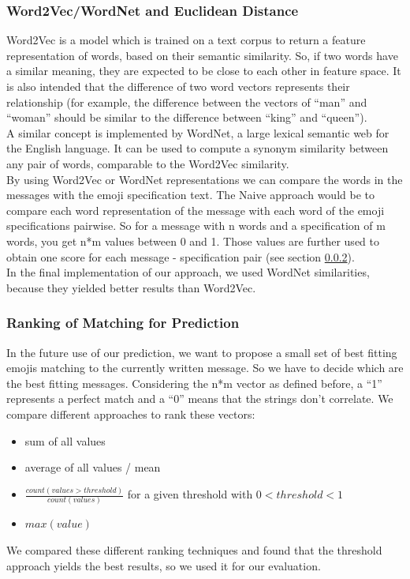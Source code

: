 \documentclass{article}
\begin{document}
\subsubsection{Word2Vec/WordNet and Euclidean Distance}
\label{word2vec}
Word2Vec is a model which is trained on a text corpus to return a feature representation of words, based on their semantic similarity. So, if two words have a similar meaning, they are expected to be close to each other in feature space. It is also intended that the difference of two word vectors represents their relationship (for example, the difference between the vectors of “man” and “woman” should be similar to the difference between “king” and “queen”).\\
A similar concept is implemented by WordNet, a large lexical semantic web for the English language. It can be used to compute a synonym similarity between any pair of words, comparable to the Word2Vec similarity.\\
By using Word2Vec or WordNet representations we can compare the words in the messages with the emoji specification text. The Naive approach would be to compare each word representation of the message with each word of the emoji specifications pairwise. So for a message with n words and a specification of m words, you get n*m values between 0 and 1. Those values are further used to obtain one score for each message - specification pair (see section \ref{ranking}). \\
In the final implementation of our approach, we used WordNet similarities, because they yielded better results than Word2Vec.

\subsubsection{Ranking of Matching for Prediction}
\label{ranking}
In the future use of our prediction, we want to propose a small set of best fitting emojis matching to the currently written message. So we have to decide which are the best fitting messages. Considering the n*m vector as defined before, a “1” represents a perfect match and a “0” means that the strings don’t correlate.  We compare different approaches to rank these vectors:
\begin{itemize}
    \item sum of all values
    \item average of all values / mean
    \item $\frac{count(values>threshold)}{count(values)}$ for a given threshold with $0 < threshold < 1$
    \item $max(value)$
\end{itemize}
We compared these different ranking techniques and found that the threshold approach yields the best results, so we used it for our evaluation.
\end{document}
